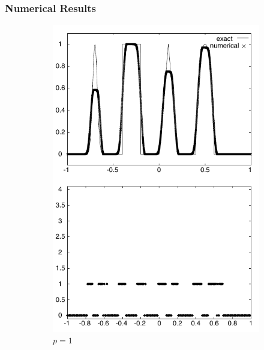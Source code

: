 \documentclass[11pt]{beamer}
\begin{document}
\begin{frame}
  \frametitle{Numerical Results}
  \begin{figure}[h]
    \centering
    \begin{subfigure}{0.35\textwidth}
      \centering
      \includegraphics[width=\textwidth]{figures/results/moment-p-1}
      \caption{$p = 1$}
    \end{subfigure}
    \hspace{2em}
    \begin{subfigure}{0.35\textwidth}
      \centering

\end{subfigure}
\end{figure}
\end{frame}
\end{document}
